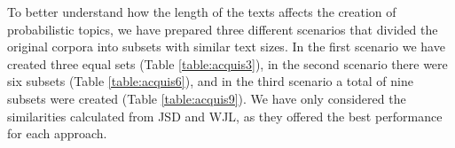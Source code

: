 To better understand how the length of the texts affects the creation of probabilistic topics, we have prepared three different scenarios that divided the original corpora into subsets with similar text sizes. In the first scenario we have created three equal sets (Table \ref{table:acquis3}), in the second scenario there were six subsets (Table \ref{table:acquis6}), and in the third scenario a total of nine subsets were created (Table \ref{table:acquis9}). We have only considered the similarities calculated from JSD and WJL, as they offered the best performance for each approach.

\begin{table}[ht]
\end{table}
